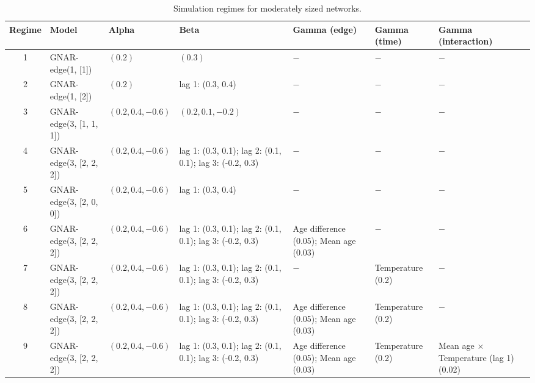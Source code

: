 \begin{table}
\caption{Simulation regimes for moderately sized networks.}
\label{tab:simulation_regimes}
\begin{tabular}{clp{2.8cm}p{4.2cm}p{4.2cm}p{2.6cm}p{4.2cm}}
\toprule
Regime & Model & Alpha & Beta & Gamma (edge) & Gamma (time) & Gamma (interaction) \\
\midrule
1 & GNAR-edge(1, [1]) & $(0.2)$ & $(0.3)$ & $-$ & $-$ & $-$ \\
2 & GNAR-edge(1, [2]) & $(0.2)$ & lag 1: (0.3, 0.4) & $-$ & $-$ & $-$ \\
3 & GNAR-edge(3, [1, 1, 1]) & $(0.2, 0.4, -0.6)$ & $(0.2, 0.1, -0.2)$ & $-$ & $-$ & $-$ \\
4 & GNAR-edge(3, [2, 2, 2]) & $(0.2, 0.4, -0.6)$ & lag 1: (0.3, 0.1); lag 2: (0.1, 0.1); lag 3: (-0.2, 0.3) & $-$ & $-$ & $-$ \\
5 & GNAR-edge(3, [2, 0, 0]) & $(0.2, 0.4, -0.6)$ & lag 1: (0.3, 0.4) & $-$ & $-$ & $-$ \\
6 & GNAR-edge(3, [2, 2, 2]) & $(0.2, 0.4, -0.6)$ & lag 1: (0.3, 0.1); lag 2: (0.1, 0.1); lag 3: (-0.2, 0.3) & Age difference (0.05); Mean age (0.03) & $-$ & $-$ \\
7 & GNAR-edge(3, [2, 2, 2]) & $(0.2, 0.4, -0.6)$ & lag 1: (0.3, 0.1); lag 2: (0.1, 0.1); lag 3: (-0.2, 0.3) & $-$ & Temperature (0.2) & $-$ \\
8 & GNAR-edge(3, [2, 2, 2]) & $(0.2, 0.4, -0.6)$ & lag 1: (0.3, 0.1); lag 2: (0.1, 0.1); lag 3: (-0.2, 0.3) & Age difference (0.05); Mean age (0.03) & Temperature (0.2) & $-$ \\
9 & GNAR-edge(3, [2, 2, 2]) & $(0.2, 0.4, -0.6)$ & lag 1: (0.3, 0.1); lag 2: (0.1, 0.1); lag 3: (-0.2, 0.3) & Age difference (0.05); Mean age (0.03) & Temperature (0.2) & Mean age $\times$ Temperature (lag 1) (0.02) \\
\bottomrule
\end{tabular}
\end{table}
